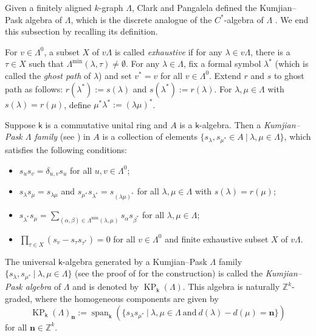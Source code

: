 \documentclass[a4paper,reqno,11pt]{amsart}
\numberwithin{equation}{section}
\theoremstyle{definition}
\theoremstyle{remark}
\newcommand{\lspan}{\operatorname{span}}
\newcommand{\KP}{\operatorname{KP}}
\newcommand{\N}{\mathbf{n}}
\begin{document}
Given a finitely aligned $k$-graph $\Lambda$, Clark and Pangalela \cite{Clark} defined the Kumjian--Pask algebra of $\Lambda$, which is the discrete analogue of the $C^*$-algebra of $\Lambda$ \cite{Yeend}. We end this subsection by recalling its definition.

For $v\in \Lambda^0$, a subset $X$ of $v\Lambda$ is called \emph{exhaustive} if for any $\lambda\in v\Lambda$, there is a $\tau\in X$ such that $\Lambda^{\min}(\lambda,\tau)\neq \emptyset$. For any $\lambda\in \Lambda$, fix a formal symbol $\lambda^*$ (which is called the \emph{ghost path} of $\lambda$) and set $v^*=v$ for all $v\in \Lambda^0$. Extend $r$ and $s$ to ghost path as follows: $r(\lambda^*):=s(\lambda)$ and $s(\lambda^*):=r(\lambda)$. For $\lambda,\mu\in \Lambda$ with $s(\lambda)=r(\mu)$, define $\mu^*\lambda^*:=(\lambda\mu)^*$. 

Suppose $\mathsf{k}$ is a commutative unital ring and $A$ is a $\mathsf{k}$-algebra. Then a \emph{Kumjian--Pask $\Lambda$ family} (see \cite[Definition 3.1]{Clark}) in $A$ is a collection of elements $\{s_\lambda,s_{\mu^*}\in A~|~\lambda,\mu\in \Lambda\}$, which satisfies the following conditions:
\begin{itemize}
\item[(KP1)] $s_u s_v=\delta_{u,v}s_u$ for all $u,v\in \Lambda^0$;

\item[(KP2)] $s_\lambda s_\mu=s_{\lambda\mu}$ and $s_{\mu^*} s_{\lambda^*}=s_{(\lambda\mu)^*}$ for all $\lambda,\mu\in \Lambda$ with $s(\lambda)=r(\mu)$;

\item[(KP3)] $s_{\lambda^*}s_\mu=\displaystyle{\sum_{(\alpha,\beta)\in \Lambda^{\min}(\lambda,\mu)}}s_\alpha s_{\beta^*}$ for all $\lambda,\mu\in \Lambda$;

\item[(KP4)] $\displaystyle{\prod_{\tau\in X}}\left(s_v-s_\tau s_{\tau^*}\right)=0$ for all $v\in \Lambda^0$ and finite exhaustive subset $X$ of $v\Lambda$. 
\end{itemize}
The universal $\mathsf{k}$-algebra generated by a Kumjian--Pask $\Lambda$ family $\{s_\lambda,s_{\mu^*}~|~\lambda,\mu\in \Lambda\}$ (see the proof of \cite[Theorem 3.7]{Clark} for the construction) is called the \emph{Kumjian--Pask algebra} of $\Lambda$ and is denoted by $\KP_\mathsf{k}(\Lambda)$. This algebra is naturally $\mathbb{Z}^k$-graded, where the homogeneous components are given by \[\KP_\mathsf{k}(\Lambda)_\N:=\lspan_\mathsf{k}\left(\{s_\lambda s_{\mu^*}~|~\lambda,\mu\in \Lambda~\text{and}~d(\lambda)-d(\mu)=\N\}\right)\] for all $\N\in \mathbb{Z}^k$. 
 
\end{document}
